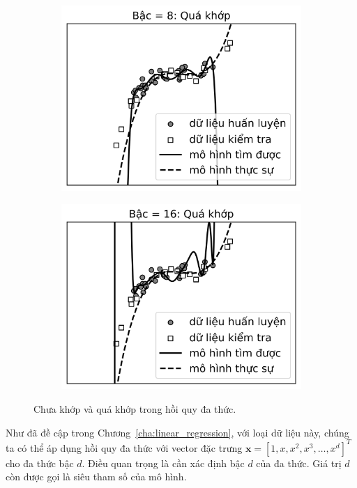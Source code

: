 \begin{figure}[t]
\begin{subfigure}{0.49\textwidth}
\includegraphics[width=0.99\linewidth]{ebookML_src/src/overfitting/poly8.png}
\caption{}
\label{fig:15_polyregc}
\end{subfigure}
\begin{subfigure}{0.49\textwidth}
\includegraphics[width=0.99\linewidth]{ebookML_src/src/overfitting/poly16.png}
\caption{}
\label{fig:15_polyregd}
\end{subfigure}
\caption{
Chưa khớp và quá khớp trong hồi quy đa thức.
}
\label{fig:15_polyreg}
\end{figure}

Như đã đề cập trong Chương~\ref{cha:linear_regression}, với loại dữ liệu này,
chúng ta có thể áp dụng hồi quy đa thức với vector đặc trưng
$\mathbf{x} = [1, x, x^2, x^3, \dots, x^d]^T$ cho đa thức bậc $d$. Điều quan
trọng là cần xác định bậc $d$ của đa thức. Giá trị $d$ còn được gọi là siêu tham số của mô hình.

